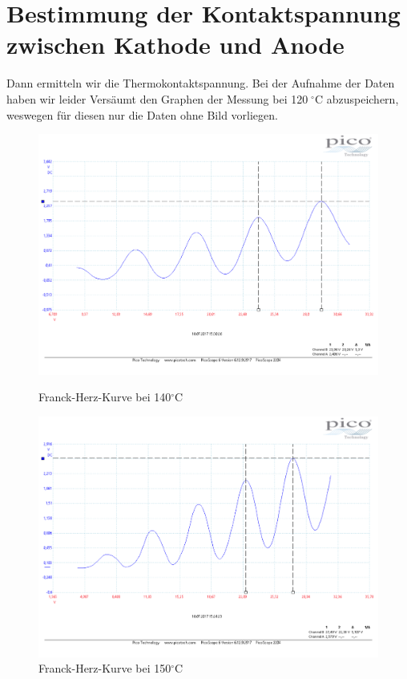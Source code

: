 \section{Bestimmung der Kontaktspannung zwischen Kathode und Anode}
Dann ermitteln wir die Thermokontaktspannung. Bei der Aufnahme der Daten haben wir leider Versäumt den Graphen der Messung bei 120$\; ^\circ $C abzuspeichern, weswegen für diesen nur die Daten ohne Bild vorliegen.
\begin{figure}
	\centering
	\includegraphics[width=\textwidth]{../Daten/Aufgabe1/Frank_Hertz_140.pdf}
	\caption{Franck-Herz-Kurve bei 140$ ^\circ $C}
	\includegraphics[width=\textwidth]{../Daten/Aufgabe1/Frank_Hertz_150.pdf}
	\caption{Franck-Herz-Kurve bei 150$ ^\circ $C}
\end{figure}
